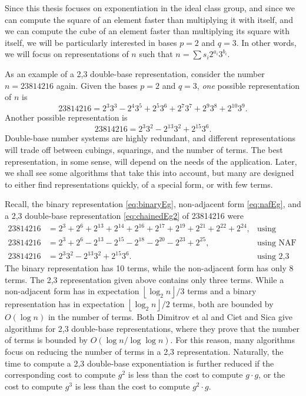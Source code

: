 \documentclass{ucalgthes1}
\theoremstyle{definition}
\newcommand{\floor}[1]{\left\lfloor #1 \right\rfloor}
\begin{document}
Since this thesis focuses on exponentiation in the ideal class group, and since we can compute the square of an element faster than multiplying it with itself, and we can compute the cube of an element faster than multiplying its square with itself, we will be particularly interested in bases $p=2$ and $q=3$.  In other words, we will focus on representations of $n$ such that $n = \sum s_i 2^{a_i} 3^{b_i}$.

As an example of a 2,3 double-base representation, consider the number $n=23814216$ again.  Given the bases $p=2$ and $q=3$, \emph{one} possible representation of $n$ is
\begin{equation}\label{eq:chainedEg1}
	23814216 = 2^3 3^3 - 2^4 3^5 + 2^5 3^6  + 2^7 3^7  + 2^9 3^8 + 2^{10} 3^9.
\end{equation}
Another possible representation is
\begin{equation}\label{eq:chainedEg2}
	23814216 = 2^3 3^2 -2^{13} 3^2 +2^{15} 3^6.
\end{equation}
Double-base number systems are highly redundant, and different representations will trade off between cubings, squarings, and the number of terms.  The best representation, in some sense, will depend on the needs of the application.  Later, we shall see some algorithms that take this into account, but many are designed to either find representations quickly, of a special form, or with few terms.

Recall, the binary representation \eqref{eq:binaryEg}, non-adjacent form \eqref{eq:nafEg}, and a 2,3 double-base representation \eqref{eq:chainedEg2} of 23814216 were
\begin{align*}
	23814216 &= 2^3+2^6+2^{13}+2^{14}+2^{16}+2^{17}+2^{19}+2^{21}+2^{22}+2^{24}, & \mbox{using binary} \\
	23814216 &= 2^3+2^6-2^{13}-2^{15}-2^{18}-2^{20}-2^{23}+2^{25}, & \mbox{using NAF} \\
	23814216 &= 2^3 3^2 -2^{13} 3^2 +2^{15} 3^6. & \mbox{using 2,3 DBNS}
\end{align*}
The binary representation has 10 terms, while the non-adjacent form has only 8 terms.  The 2,3 representation given above contains only three terms.  While a non-adjacent form has in expectation $\floor{\log_2 n}/3$ terms and a binary representation has in expectation $\floor{\log_2 n}/2$ terms, both are bounded by $O(\log n)$ in the number of terms.  Both Dimitrov et al \cite{Dimitrov2008} and Ciet and Sica \cite{Ciet2005} give algorithms for 2,3 double-base representations, where they prove that the number of terms is bounded by $O(\log n / \log \log n)$.  For this reason, many algorithms focus on reducing the number of terms in a 2,3 representation.   Naturally, the time to compute a 2,3 double-base exponentiation is further reduced if the corresponding cost to compute $g^2$ is less than the cost to compute $g \cdot g$, or the cost to compute $g^3$ is less than the cost to compute $g^2 \cdot g$. 
\end{document}

